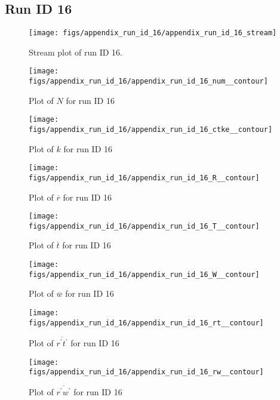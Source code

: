 \subsection{Run ID 16}
\begin{figure}[H]
\centering
\texttt{[image: figs/appendix\_run\_id\_16/appendix\_run\_id\_16\_stream]}
\caption{Stream plot of run ID 16.}
\label{fig:appendix_run_id_16_stream}
\end{figure}


\begin{figure}[H]
\centering
\texttt{[image: figs/appendix\_run\_id\_16/appendix\_run\_id\_16\_num\_\_contour]}
\caption{Plot of $N$ for run ID 16}
\label{fig:appendix_run_id_16_num__contour}
\end{figure}


\begin{figure}[H]
\centering
\texttt{[image: figs/appendix\_run\_id\_16/appendix\_run\_id\_16\_ctke\_\_contour]}
\caption{Plot of $k$ for run ID 16}
\label{fig:appendix_run_id_16_ctke__contour}
\end{figure}


\begin{figure}[H]
\centering
\texttt{[image: figs/appendix\_run\_id\_16/appendix\_run\_id\_16\_R\_\_contour]}
\caption{Plot of $\overline{r}$ for run ID 16}
\label{fig:appendix_run_id_16_R__contour}
\end{figure}


\begin{figure}[H]
\centering
\texttt{[image: figs/appendix\_run\_id\_16/appendix\_run\_id\_16\_T\_\_contour]}
\caption{Plot of $\overline{t}$ for run ID 16}
\label{fig:appendix_run_id_16_T__contour}
\end{figure}


\begin{figure}[H]
\centering
\texttt{[image: figs/appendix\_run\_id\_16/appendix\_run\_id\_16\_W\_\_contour]}
\caption{Plot of $\overline{w}$ for run ID 16}
\label{fig:appendix_run_id_16_W__contour}
\end{figure}


\begin{figure}[H]
\centering
\texttt{[image: figs/appendix\_run\_id\_16/appendix\_run\_id\_16\_rt\_\_contour]}
\caption{Plot of $\overline{r^\prime t^\prime}$ for run ID 16}
\label{fig:appendix_run_id_16_rt__contour}
\end{figure}


\begin{figure}[H]
\centering
\texttt{[image: figs/appendix\_run\_id\_16/appendix\_run\_id\_16\_rw\_\_contour]}
\caption{Plot of $\overline{r^\prime w^\prime}$ for run ID 16}
\label{fig:appendix_run_id_16_rw__contour}
\end{figure}


